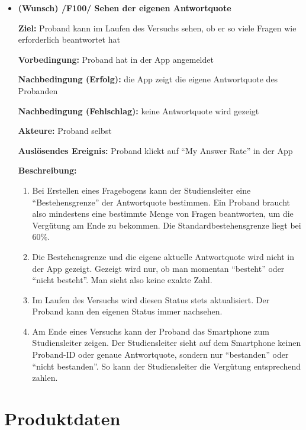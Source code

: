 \documentclass[a4paper]{scrreprt}
\begin{document}
\begin{itemize}
            \item \textbf{(Wunsch) /F100/ Sehen der eigenen \gls{Antwortquote}}

            \par \textbf{Ziel: }\gls{Proband} kann im Laufen des Versuchs sehen, ob er so viele Fragen wie erforderlich beantwortet hat
            \par \textbf{Vorbedingung: }\gls{Proband} hat in der App angemeldet
            \par \textbf{Nachbedingung (Erfolg): }die App zeigt die eigene \gls{Antwortquote} des \gls{Proband}en
            \par \textbf{Nachbedingung (Fehlschlag): }keine \gls{Antwortquote} wird gezeigt
            \par \textbf{Akteure: }\gls{Proband} selbst
            \par \textbf{Auslösendes Ereignis: }\gls{Proband} klickt auf “My Answer Rate” in der App
            \par \textbf{Beschreibung: }
                \begin{enumerate}
                    \item Bei Erstellen eines Fragebogens kann der \gls{Studiensleiter} eine “Bestehensgrenze” der \gls{Antwortquote} bestimmen. Ein \gls{Proband} braucht also mindestens eine bestimmte Menge von Fragen beantworten, um die Vergütung am Ende zu bekommen. Die Standardbestehensgrenze liegt bei 60\%.
                    \item Die Bestehensgrenze und die eigene aktuelle \gls{Antwortquote} wird nicht in der App gezeigt. Gezeigt wird nur, ob man momentan “besteht” oder “nicht besteht”. Man sieht also keine exakte Zahl.
                    \item Im Laufen des Versuchs wird diesen Status stets aktualisiert. Der \gls{Proband} kann den eigenen Status immer nachsehen.
                    \item Am Ende eines Versuchs kann der \gls{Proband} das Smartphone zum \gls{Studiensleiter} zeigen. Der \gls{Studiensleiter} sieht auf dem Smartphone keinen \gls{Proband}-ID oder genaue \gls{Antwortquote}, sondern nur “bestanden” oder “nicht bestanden”. So kann der \gls{Studiensleiter} die Vergütung entsprechend zahlen.
                \end{enumerate}

        \end{itemize}

    \chapter{Produktdaten}
\end{document}

